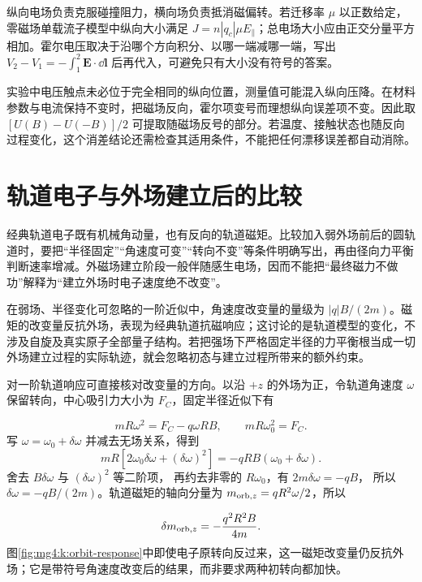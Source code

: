 纵向电场负责克服碰撞阻力，横向场负责抵消磁偏转。若迁移率 $\mu$ 以正数给定，零磁场单载流子模型中纵向大小满足 $J=n|q_c|\mu E_\parallel$；总电场大小应由正交分量平方相加。霍尔电压取决于沿哪个方向积分、以哪一端减哪一端，写出 $V_2-V_1=-\int_1^2\bm E\cdot\dd\bm l$ 后再代入，可避免只有大小没有符号的答案。


实验中电压触点未必位于完全相同的纵向位置，测量值可能混入纵向压降。在材料参数与电流保持不变时，把磁场反向，霍尔项变号而理想纵向误差项不变。因此取 $[U(B)-U(-B)]/2$ 可提取随磁场反号的部分。若温度、接触状态也随反向过程变化，这个消差结论还需检查其适用条件，不能把任何漂移误差都自动消除。




\section{轨道电子与外场建立后的比较}
经典轨道电子既有机械角动量，也有反向的轨道磁矩。比较加入弱外场前后的圆轨道时，要把“半径固定”“角速度可变”“转向不变”等条件明确写出，再由径向力平衡判断速率增减。外磁场建立阶段一般伴随感生电场，因而不能把“最终磁力不做功”解释为“建立外场时电子速度绝不改变”。


在弱场、半径变化可忽略的一阶近似中，角速度改变量的量级为 $|q|B/(2m)$。磁矩的改变量反抗外场，表现为经典轨道抗磁响应；这讨论的是轨道模型的变化，不涉及自旋及真实原子全部量子结构。若把强场下严格固定半径的力平衡根当成一切外场建立过程的实际轨迹，就会忽略初态与建立过程所带来的额外约束。



对一阶轨道响应可直接核对改变量的方向。以沿 $+z$ 的外场为正，令轨道角速度 $\omega$ 保留转向，中心吸引力大小为 $F_C$，固定半径近似下有

\[
 mR\omega^2=F_C-q\omega RB,\qquad mR\omega_0^2=F_C.
\]
写 $\omega=\omega_0+\delta\omega$ 并减去无场关系，得到
\[
 mR[2\omega_0\delta\omega+(\delta\omega)^2]
 =-qRB(\omega_0+\delta\omega).
\]
舍去 $B\delta\omega$ 与 $(\delta\omega)^2$ 等二阶项，
再约去非零的 $R\omega_0$，有 $2m\delta\omega=-qB$，
所以 $\delta\omega=-qB/(2m)$。轨道磁矩的轴向分量为 $m_{{\rm orb},z}=qR^2\omega/2$，所以

\[
 \delta m_{{\rm orb},z}=-\frac{q^2R^2B}{4m}.
\]
图\ref{fig:mg4:k:orbit-response}中即使电子原转向反过来，这一磁矩改变量仍反抗外场；它是带符号角速度改变后的结果，而非要求两种初转向都加快。



